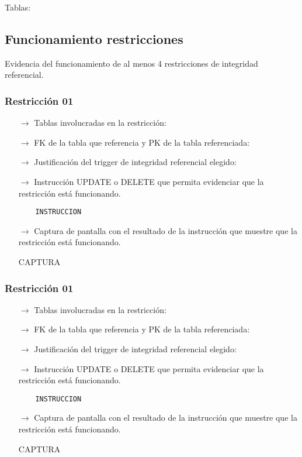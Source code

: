Tablas:



\subsection{Funcionamiento restricciones}

Evidencia del funcionamiento de al menos 4 restricciones de integridad referencial.

\subsubsection*{Restricción 01}

\begin{itemize}
    \item[$\rightarrow$] Tablas involucradas en la restricción: 
    \item[$\rightarrow$] FK de la tabla que referencia y PK de la tabla referenciada: 
    \item[$\rightarrow$] Justificación del trigger de integridad referencial elegido: 
    \item[$\rightarrow$] Instrucción UPDATE o DELETE que permita evidenciar que la restricción está
    funcionando.
    \begin{verbatim}
    INSTRUCCION
    \end{verbatim}
    \item[$\rightarrow$] Captura de pantalla con el resultado de la instrucción que muestre que la restricción está
    funcionando.
    \begin{center}
        CAPTURA
    \end{center}
\end{itemize}

\subsubsection*{Restricción 01}

\begin{itemize}
    \item[$\rightarrow$] Tablas involucradas en la restricción: 
    \item[$\rightarrow$] FK de la tabla que referencia y PK de la tabla referenciada: 
    \item[$\rightarrow$] Justificación del trigger de integridad referencial elegido: 
    \item[$\rightarrow$] Instrucción UPDATE o DELETE que permita evidenciar que la restricción está
    funcionando.
    \begin{verbatim}
    INSTRUCCION
    \end{verbatim}
    \item[$\rightarrow$] Captura de pantalla con el resultado de la instrucción que muestre que la restricción está
    funcionando.
    \begin{center}
        CAPTURA
    \end{center}
\end{itemize}


